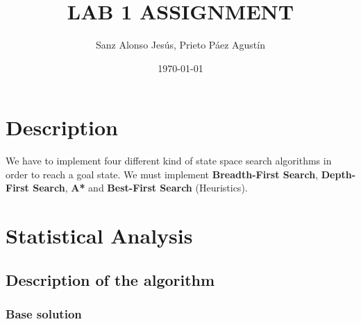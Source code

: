 \documentclass{article}
\title{LAB 1 ASSIGNMENT}
\author{Sanz Alonso Jesús, Prieto Páez Agustín}
\date{\today}
\begin{document}
\pagestyle{fancy}
\fancyfoot[C]{\thepage}
\maketitle
\tableofcontents

\section{Description}
We have to implement four different kind of state space search algorithms in order to reach a goal state. We must implement \textbf{Breadth-First Search}, \textbf{Depth-First Search}, \textbf{A*} and \textbf{Best-First Search} (Heuristics).

\section{Statistical Analysis}
\subsection{Description of the algorithm}
\subsubsection{Base solution}
\end{document}
